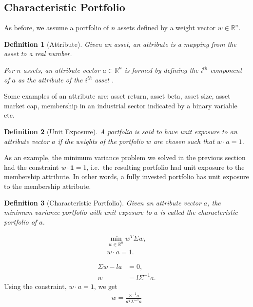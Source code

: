 \documentclass{amsart}
\theoremstyle{plain}
\newtheorem{definition}{Definition}
\numberwithin{equation}{section}
\begin{document}
\subsection*{Characteristic Portfolio}
As before, we assume a portfolio of 
$n$ assets defined by a weight vector 
$w \in \mathbb{R}^n$. 

\begin{definition}[Attribute]
Given an asset, an attribute is a mapping 
from the asset to a real number. 

For $n$ assets, an attribute vector $a \in \mathbb{R}^n$ 
is formed by defining the $i^{th}$ component of $a$ as  
the attribute of the $i^{th}$ asset .    
\end{definition}

Some examples of an attribute are: asset return, 
asset beta, asset size, asset market cap, membership 
in an industrial sector indicated by a binary variable etc. 

\begin{definition}[Unit Exposure]
A portfolio 
is said to have unit exposure to an attribute 
vector $a$ if the weights of the portfolio $w$ 
are chosen such that $w \cdot a = 1$. 
\end{definition}

As an example, the minimum variance problem we solved in the 
previous section had the constraint $w \cdot \mathbf{1} = 1$, i.e.\
the resulting portfolio had unit exposure to the membership 
attribute. In other words, a fully invested portfolio has unit 
exposure to the membership attribute. 

\begin{definition}[Characteristic Portfolio]
Given an attribute vector $a$, the minimum variance 
portfolio with unit exposure to $a$ is called the 
characteristic portfolio of $a$. 
\end{definition}

\begin{align*}
\min_{w \in \mathbb{R}^n} w^T \Sigma w,\\
w \cdot a = 1.
\end{align*}

\begin{align*}
\Sigma w - l a &= 0, \\
w &= l \Sigma^{-1} a.
\end{align*}
Using the constraint, $w \cdot a = 1$,
we get
\begin{align*}
w = \frac{\Sigma^{-1}a}{a^T \Sigma^{-1} a}
\end{align*}
\end{document}
